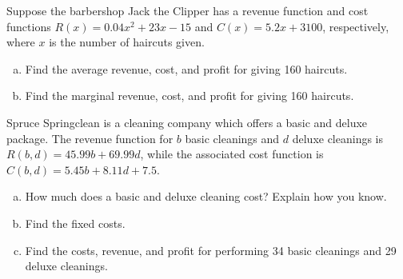 \documentclass[11pt,letterpaper]{article}
\begin{document}
\newpage



 Suppose the barbershop Jack the Clipper has a revenue function and cost functions $R(x)= 0.04x^2 + 23x - 15$ and $C(x)= 5.2x + 3100$, respectively, where $x$ is the number of haircuts given. 
	\begin{enumerate}[(a)]
	\item Find the average revenue, cost, and profit for giving 160 haircuts.
	\item Find the marginal revenue, cost, and profit for giving 160 haircuts. 
	\end{enumerate}



\newpage



 Spruce Springclean is a cleaning company which offers a basic and deluxe package. The revenue function for $b$ basic cleanings and $d$ deluxe cleanings is $R(b, d)= 45.99b + 69.99d$, while the associated cost function is $C(b, d)= 5.45b + 8.11d + 7.5$. 
	\begin{enumerate}[(a)]
	\item How much does a basic and deluxe cleaning cost? Explain how you know. 
	\item Find the fixed costs.
	\item Find the costs, revenue, and profit for performing 34 basic cleanings and 29 deluxe cleanings. 
	\end{enumerate}
\end{document}
